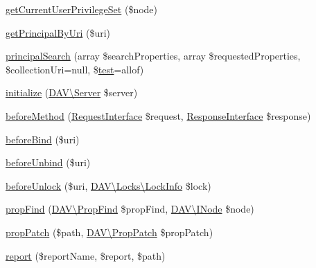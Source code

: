 \begin{DoxyCompactItemize}
\mbox{\hyperlink{class_sabre_1_1_d_a_v_a_c_l_1_1_plugin_aea94f82c23c1b7f8df83e686878e8e3f}{get\+Current\+User\+Privilege\+Set}} (\$node)
\item 
\mbox{\hyperlink{class_sabre_1_1_d_a_v_a_c_l_1_1_plugin_a835383eab7a795345e0a6df865a7aef5}{get\+Principal\+By\+Uri}} (\$uri)
\item 
\mbox{\hyperlink{class_sabre_1_1_d_a_v_a_c_l_1_1_plugin_a4b74678db1f6de5913d9bd0fe144a099}{principal\+Search}} (array \$search\+Properties, array \$requested\+Properties, \$collection\+Uri=null, \$\mbox{\hyperlink{classtest}{test}}=\textquotesingle{}allof\textquotesingle{})
\item 
\mbox{\hyperlink{class_sabre_1_1_d_a_v_a_c_l_1_1_plugin_ad225ddd04a419819afb53fa1c50e9143}{initialize}} (\mbox{\hyperlink{class_sabre_1_1_d_a_v_1_1_server}{D\+A\+V\textbackslash{}\+Server}} \$server)
\item 
\mbox{\hyperlink{class_sabre_1_1_d_a_v_a_c_l_1_1_plugin_a7d29079839d48db4473122f2d08cbeed}{before\+Method}} (\mbox{\hyperlink{interface_sabre_1_1_h_t_t_p_1_1_request_interface}{Request\+Interface}} \$request, \mbox{\hyperlink{interface_sabre_1_1_h_t_t_p_1_1_response_interface}{Response\+Interface}} \$response)
\item 
\mbox{\hyperlink{class_sabre_1_1_d_a_v_a_c_l_1_1_plugin_a86634976c59f1205007af7f6e1c8227c}{before\+Bind}} (\$uri)
\item 
\mbox{\hyperlink{class_sabre_1_1_d_a_v_a_c_l_1_1_plugin_ae31d0adcdbedba41361e069502e176df}{before\+Unbind}} (\$uri)
\item 
\mbox{\hyperlink{class_sabre_1_1_d_a_v_a_c_l_1_1_plugin_adc97f0a29d70deb613055867749d9ca3}{before\+Unlock}} (\$uri, \mbox{\hyperlink{class_sabre_1_1_d_a_v_1_1_locks_1_1_lock_info}{D\+A\+V\textbackslash{}\+Locks\textbackslash{}\+Lock\+Info}} \$lock)
\item 
\mbox{\hyperlink{class_sabre_1_1_d_a_v_a_c_l_1_1_plugin_a1e38a9b2fc4b631f6a334e3291f5e4e7}{prop\+Find}} (\mbox{\hyperlink{class_sabre_1_1_d_a_v_1_1_prop_find}{D\+A\+V\textbackslash{}\+Prop\+Find}} \$prop\+Find, \mbox{\hyperlink{interface_sabre_1_1_d_a_v_1_1_i_node}{D\+A\+V\textbackslash{}\+I\+Node}} \$node)
\item 
\mbox{\hyperlink{class_sabre_1_1_d_a_v_a_c_l_1_1_plugin_a1e3084ec3f43a0fa10555bb681e4ad8b}{prop\+Patch}} (\$path, \mbox{\hyperlink{class_sabre_1_1_d_a_v_1_1_prop_patch}{D\+A\+V\textbackslash{}\+Prop\+Patch}} \$prop\+Patch)
\item 
\mbox{\hyperlink{class_sabre_1_1_d_a_v_a_c_l_1_1_plugin_a8fd89e987403abdbca4a8fe30701afc1}{report}} (\$report\+Name, \$report, \$path)

\end{DoxyCompactItemize}
